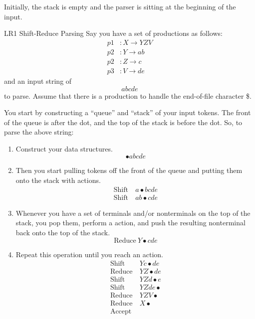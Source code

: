 Initially, the stack is empty and the parser is sitting at the beginning of the input.

\begin{example}[]{LR1 Shift-Reduce Parsing}
  Say you have a set of productions as follows:
  \begin{align*}
    p1&: X \rightarrow YZV \\
    p2&: Y \rightarrow ab \\
    p2&: Z \rightarrow c \\
    p3&: V \rightarrow de
  \end{align*}
  and an input string of
  \begin{equation*}
    abcde
  \end{equation*}
  to parse.
  Assume that there is a production to handle the end-of-file character \$.

  \tcblower

  You start by constructing a ``queue'' and ``stack'' of your input tokens.
  The front of the queue is after the dot, and the top of the stack is before the dot.
  So, to parse the above string:
  \begin{enumerate}[noitemsep]
  \item Construct your data structures.
    \begin{equation*}
      \bullet abcde
    \end{equation*}
  \item Then you start pulling tokens off the front of the queue and putting them onto the stack with  actions.
    \begin{align*}
      \text{Shift}& \: a \bullet bcde \\
      \text{Shift}& \: ab \bullet cde
    \end{align*}
  \item Whenever you have a set of terminals and/or nonterminals on the top of the stack, you pop them, perform a  action, and push the resulting nonterminal back onto the top of the stack.
    \begin{equation*}
      \text{Reduce} \: Y \bullet cde
    \end{equation*}
  \item Repeat this operation until you reach an  action.
    \begin{align*}
      \text{Shift}& \: Yc \bullet de \\
      \text{Reduce}& \: YZ \bullet de \\
      \text{Shift}& \: YZd \bullet e \\
      \text{Shift}& \: YZde \bullet \\
      \text{Reduce}& \: YZV \bullet \\
      \text{Reduce}& \: X \bullet \\
      \text{Accept}&
    \end{align*}
  \end{enumerate}
\end{example}

